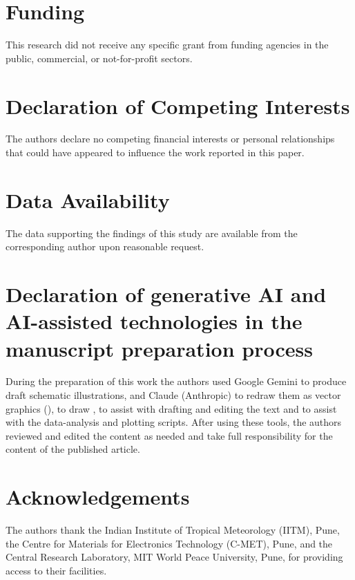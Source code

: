 \documentclass[preprint,11pt]{elsarticle}
\begin{document}
\section*{Funding}
This research did not receive any specific grant from funding agencies in the public, commercial, or not-for-profit sectors.

\section*{Declaration of Competing Interests}
The authors declare no competing financial interests or personal relationships that could have appeared to influence the work reported in this paper.

\section*{Data Availability}
The data supporting the findings of this study are available from the corresponding author upon reasonable request.

\section*{Declaration of generative AI and AI-assisted technologies in the manuscript preparation process}
During the preparation of this work the authors used Google Gemini to produce draft schematic illustrations, and Claude (Anthropic) to redraw them as vector graphics (), to draw , to assist with drafting and editing the text and to assist with the data-analysis and plotting scripts. After using these tools, the authors reviewed and edited the content as needed and take full responsibility for the content of the published article.

\section*{Acknowledgements}
The authors thank the Indian Institute of Tropical Meteorology (IITM), Pune, the Centre for Materials for Electronics Technology (C-MET), Pune, and the Central Research Laboratory, MIT World Peace University, Pune, for providing access to their facilities.


\FloatBarrier

{\footnotesize\setlength{\bibsep}{0pt}}
\end{document}
